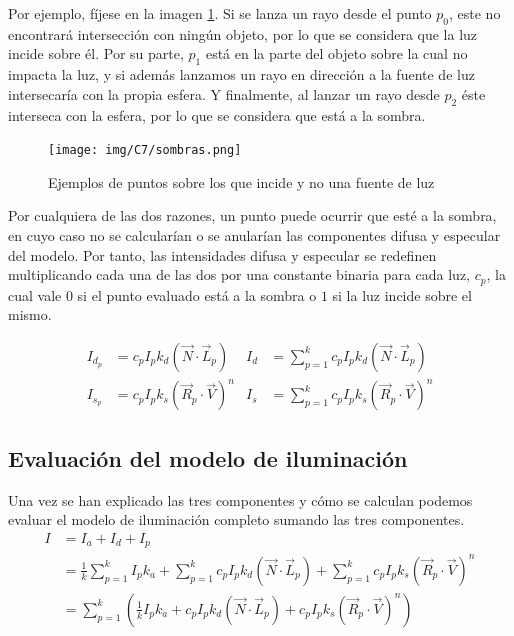 Por ejemplo, fíjese en la imagen \ref{fig:sombras}. Si se lanza un rayo desde el punto $p_0$, este no encontrará intersección con ningún objeto, por lo que se considera que la luz incide sobre él. Por su parte, $p_1$ está en la parte del objeto sobre la cual no impacta la luz, y si además lanzamos un rayo en dirección a la fuente de luz intersecaría con la propia esfera. Y finalmente, al lanzar un rayo desde $p_2$ éste interseca con la esfera, por lo que se considera que está a la sombra.

\begin{figure} [ht]
    \centering
    \texttt{[image: img/C7/sombras.png]}
    \caption{Ejemplos de puntos sobre los que incide y no una fuente de luz}
    \label{fig:sombras}
\end{figure}

Por cualquiera de las dos razones, un punto puede ocurrir que esté a la sombra, en cuyo caso no se calcularían o se anularían las componentes difusa y especular del modelo. Por tanto, las intensidades difusa y especular se redefinen multiplicando cada una de las dos por una constante binaria para cada luz, $c_p$, la cual vale $0$ si el punto evaluado está a la sombra o $1$ si la luz incide sobre el mismo.

\begin{align*}
    I_{d_p} &= c_p I_p k_d (\vec N\cdot \vec L_p)  & I_d &= \sum_{p=1}^k c_p I_p k_d (\vec N\cdot \vec L_p)\\
    I_{s_p} &= c_p I_p k_s (\vec R_p\cdot \vec V)^n & I_s &= \sum_{p=1}^k c_p I_p k_s (\vec R_p \cdot \vec V)^n
\end{align*}

\subsection{Evaluación del modelo de iluminación}

Una vez se han explicado las tres componentes y cómo se calculan podemos evaluar el modelo de iluminación completo sumando las tres componentes.
\begin{equation}
    \label{eq:phong}
    \begin{split}
        I &= I_a + I_d + I_p \\
        &=\frac{1}{k}\sum_{p=1}^k I_p k_a + \sum_{p=1}^{k}c_p I_p k_d (\vec N\cdot \vec L_p) + \sum_{p=1}^{k} c_p  I_p k_s (\vec R_p\cdot \vec V)^n \\
        &=\sum_{p=1}^{k}\left(\frac{1}{k}I_p k_a + c_p I_p k_d (\vec N\cdot \vec L_p) + c_p I_p k_s (\vec R_p\cdot \vec V)^n\right)
    \end{split}
\end{equation}

